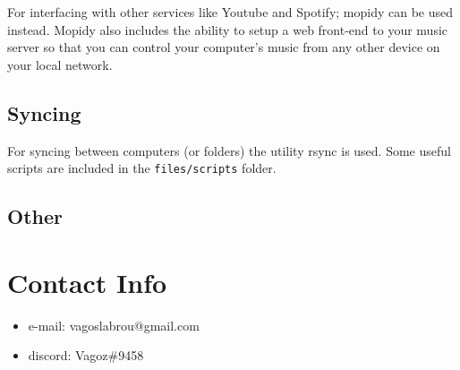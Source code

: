 \documentclass{article}
\let\src\texttt
\begin{document}
For interfacing with other services like Youtube and Spotify;
mopidy can be used instead. Mopidy also includes the ability to setup a web front-end to your music server 
so that you can control your computer's music from any other device on your local network.

\subsection{Syncing}

For syncing between computers (or folders) the utility rsync is used. 
Some useful scripts are included in the \src{files/scripts} folder.

\subsection{Other}



\section{Contact Info}

\begin{itemize}
    \item e-mail: vagoslabrou@gmail.com
    \item discord: Vagoz\#9458
\end{itemize}

\end{document}
